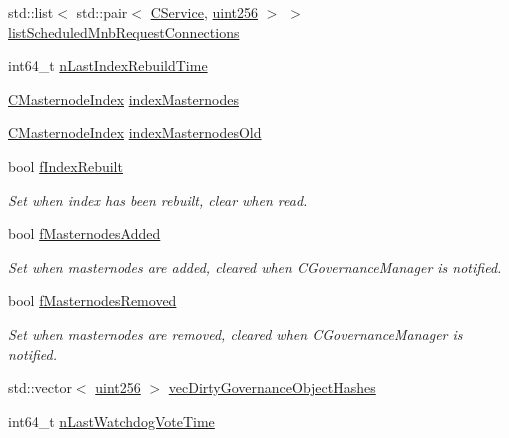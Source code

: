 \begin{DoxyCompactItemize}
std\+::list$<$ std\+::pair$<$ \mbox{\hyperlink{class_c_service}{C\+Service}}, \mbox{\hyperlink{classuint256}{uint256}} $>$ $>$ \mbox{\hyperlink{class_c_masternode_man_a438c1c33aca2a2d8597db969b4fdea04}{list\+Scheduled\+Mnb\+Request\+Connections}}
\item 
int64\+\_\+t \mbox{\hyperlink{class_c_masternode_man_a55ec9cadfad430731ad091dd4a462e36}{n\+Last\+Index\+Rebuild\+Time}}
\item 
\mbox{\hyperlink{class_c_masternode_index}{C\+Masternode\+Index}} \mbox{\hyperlink{class_c_masternode_man_ae631c540d9b38d33e04a349b72da5b91}{index\+Masternodes}}
\item 
\mbox{\hyperlink{class_c_masternode_index}{C\+Masternode\+Index}} \mbox{\hyperlink{class_c_masternode_man_aaadd2d48b9047ff8ee1d18551c06513a}{index\+Masternodes\+Old}}
\item 
bool \mbox{\hyperlink{class_c_masternode_man_a31f2425cef3cd28f39b94f0f79216deb}{f\+Index\+Rebuilt}}
\begin{DoxyCompactList}\small\item\em Set when index has been rebuilt, clear when read. \end{DoxyCompactList}\item 
bool \mbox{\hyperlink{class_c_masternode_man_a716ac28779663d77f09c61d1c9e3dff1}{f\+Masternodes\+Added}}
\begin{DoxyCompactList}\small\item\em Set when masternodes are added, cleared when C\+Governance\+Manager is notified. \end{DoxyCompactList}\item 
bool \mbox{\hyperlink{class_c_masternode_man_a7c0b463838f95b49203e8265de497f59}{f\+Masternodes\+Removed}}
\begin{DoxyCompactList}\small\item\em Set when masternodes are removed, cleared when C\+Governance\+Manager is notified. \end{DoxyCompactList}\item 
std\+::vector$<$ \mbox{\hyperlink{classuint256}{uint256}} $>$ \mbox{\hyperlink{class_c_masternode_man_a384881653ca378b6c5c1e9258af00373}{vec\+Dirty\+Governance\+Object\+Hashes}}
\item 
int64\+\_\+t \mbox{\hyperlink{class_c_masternode_man_a7920d943f9bb94fec0724f95218c37b9}{n\+Last\+Watchdog\+Vote\+Time}}
\end{DoxyCompactItemize}

